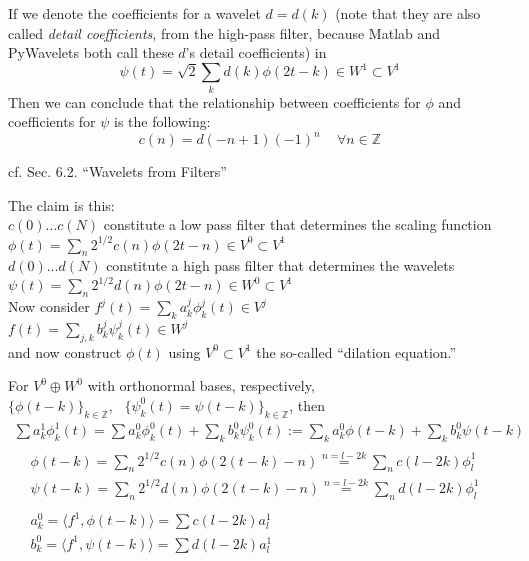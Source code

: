 \documentclass[twoside]{amsart}
\theoremstyle{plain}
\theoremstyle{definition}
\theoremstyle{remark}
\numberwithin{equation}{section}
\begin{document}
If we denote the coefficients for a wavelet $d=d(k)$ (note that they are also called \emph{detail coefficients}, from the high-pass filter, because Matlab and PyWavelets both call these $d$'s detail coefficients) in
\[
\psi(t) = \sqrt{2} \sum_k d(k) \phi(2t-k) \in W^1 \subset V^1
\]
Then we can conclude that the relationship between coefficients for $\phi$ and coefficients for $\psi$ is the following:
\[
c(n) = d(-n+1)(-1)^n  \quad \, \forall n \in \mathbb{Z}
\]

cf. Sec. 6.2. ``Wavelets from Filters'' \cite{GStrangTNguyen1996}

The claim is this: \\
$c(0) \dots c(N)$ constitute a  low pass filter that determines the scaling function $\phi(t) = \sum_n 2^{1/2}c(n) \phi(2t-n) \in V^0 \subset V^1$ \\
$d(0) \dots d(N)$ constitute a high pass filter that determines the wavelets  $\psi(t) = \sum_n 2^{1/2}d(n) \phi(2t-n) \in W^0 \subset V^1$ \\

Now consider $f^j(t) = \sum_k a_k^j \phi_k^j(t) \in V^j$\\
\phantom{Now consider} $f(t) = \sum_{j,k} b_k^j \psi_k^j(t) \in W^j$ \\
and now construct $\phi(t)$ using $V^0 \subset V^1$ the so-called ``dilation equation.''

For $V^0 \oplus W^0$  with orthonormal bases, respectively, \\
$\lbrace \phi(t-k) \rbrace_{k \in \mathbb{Z}}$, \quad \, $\lbrace \psi_k^0(t) = \psi(t-k) \rbrace_{k\in \mathbb{Z}}$, then
\[
\begin{gathered}
  \sum a_k^1 \phi_k^1(t) = \sum a^0_k \phi^0_k(t) + \sum_k b_k^0 \psi_k^0(t) := \sum_k a_k^0 \phi(t-k) + \sum_k b_k^0 \psi(t-k) \\ 
  \begin{aligned}
    & \phi(t-k) = \sum_n 2^{1/2} c(n) \phi(2(t-k)-n) \overset{n=l-2k}{=} \sum_n c(l-2k)\phi^1_l \\ 
    &  \psi(t-k) = \sum_n 2^{1/2}d(n) \phi(2(t-k)-n) \overset{n=l-2k}{=} \sum_n d(l-2k) \phi^1_l
\end{aligned} \\ 
\begin{aligned}
  & a_k^0 = \langle f^1, \phi(t-k) \rangle = \sum c(l-2k) a_l^1 \\ 
  &  b_k^0 = \langle f^1, \psi(t-k) \rangle = \sum d(l-2k) a_l^1
\end{aligned}
\end{gathered}
\]
\end{document}
